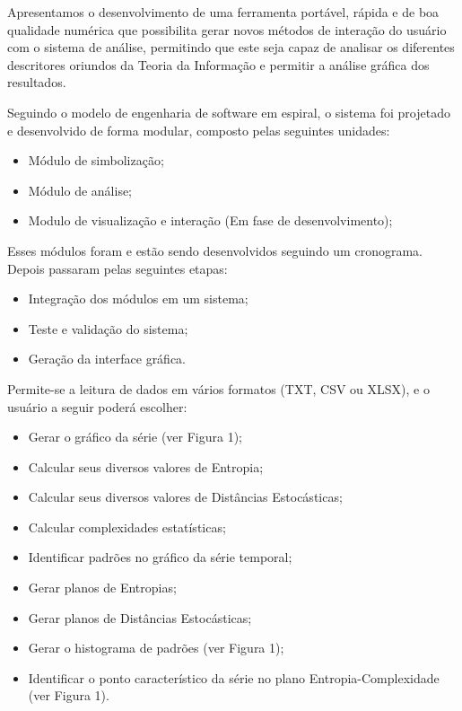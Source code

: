 
Apresentamos o desenvolvimento de uma ferramenta portável, rápida e de boa qualidade numérica que possibilita gerar novos métodos de interação do usuário com o sistema de análise, permitindo que este seja capaz de analisar os diferentes descritores oriundos da Teoria da Informação e permitir a análise gráfica dos resultados.

Seguindo o modelo de engenharia de software em espiral, o sistema foi projetado e desenvolvido de forma modular, composto pelas seguintes unidades:

\begin{itemize}
\item Módulo de simbolização;
\item Módulo de análise;
\item Modulo de visualização e interação (Em fase de desenvolvimento);
\end{itemize} 

Esses módulos foram e estão sendo desenvolvidos seguindo um cronograma. 
Depois passaram pelas seguintes etapas:

\begin{itemize}
\item Integração dos módulos em um sistema;
\item Teste e validação do sistema;
\item Geração da interface gráfica.
\end{itemize}

Permite-se a leitura de dados em vários formatos (TXT, CSV ou XLSX), e o usuário a seguir poderá escolher:

\begin{itemize}

	\item Gerar o gráfico da série (ver Figura 1);
	\item Calcular seus diversos valores de Entropia;
	\item Calcular seus diversos valores de Distâncias Estocásticas;
	\item Calcular complexidades estatísticas;
    \item Identificar padrões no gráfico da série temporal;
    \item Gerar planos de Entropias;
    \item Gerar planos de Distâncias Estocásticas;
	\item Gerar o histograma de padrões (ver Figura 1);
	\item Identificar o ponto característico da série no plano Entropia-Complexidade (ver Figura 1).

\end{itemize}

